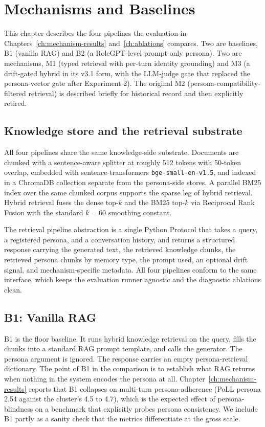 \chapter{Mechanisms and Baselines}
\label{ch:mechanisms}

This chapter describes the four pipelines the evaluation in Chapters~\ref{ch:mechanism-results} and~\ref{ch:ablations} compares. Two are baselines, B1 (vanilla RAG) and B2 (a RoleGPT-level prompt-only persona). Two are mechanisms, M1 (typed retrieval with per-turn identity grounding) and M3 (a drift-gated hybrid in its v3.1 form, with the LLM-judge gate that replaced the persona-vector gate after Experiment 2). The original M2 (persona-compatibility-filtered retrieval) is described briefly for historical record and then explicitly retired.

\section{Knowledge store and the retrieval substrate}
\label{sec:knowledge-store}

All four pipelines share the same knowledge-side substrate. Documents are chunked with a sentence-aware splitter at roughly 512 tokens with 50-token overlap, embedded with sentence-transformers \texttt{bge-small-en-v1.5}\autocite{bgeembed2023}, and indexed in a ChromaDB collection separate from the persona-side stores\autocite{chromadb}. A parallel BM25 index over the same chunked corpus supports the sparse leg of hybrid retrieval. Hybrid retrieval fuses the dense top-$k$ and the BM25 top-$k$ via Reciprocal Rank Fusion with the standard $k = 60$ smoothing constant\autocite{rrf2009}.

The retrieval pipeline abstraction is a single Python Protocol that takes a query, a registered persona, and a conversation history, and returns a structured response carrying the generated text, the retrieved knowledge chunks, the retrieved persona chunks by memory type, the prompt used, an optional drift signal, and mechanism-specific metadata. All four pipelines conform to the same interface, which keeps the evaluation runner agnostic and the diagnostic ablations clean.

\section{B1: Vanilla RAG}

B1 is the floor baseline. It runs hybrid knowledge retrieval on the query, fills the chunks into a standard RAG prompt template, and calls the generator. The persona argument is ignored. The response carries an empty persona-retrieval dictionary. The point of B1 in the comparison is to establish what RAG returns when nothing in the system encodes the persona at all. Chapter~\ref{ch:mechanism-results} reports that B1 collapses on multi-turn persona-adherence (PoLL persona 2.54 against the cluster's 4.5 to 4.7), which is the expected effect of persona-blindness on a benchmark that explicitly probes persona consistency. We include B1 partly as a sanity check that the metrics differentiate at the gross scale.

